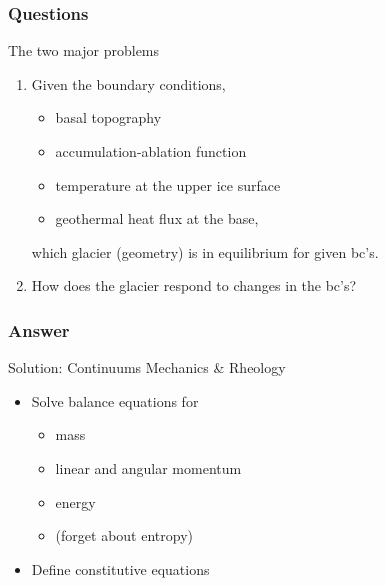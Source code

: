 \documentclass[hide notes,intlimits]{beamer}
\begin{document}
\begin{frame}
  \frametitle{Questions}
 \begin{block}{The two major problems}
   \begin{enumerate}
   \item Given the boundary conditions,
     \begin{itemize}
     \item basal topography
     \item accumulation-ablation function
     \item temperature at the upper ice surface
     \item geothermal heat flux at the base,
   \end{itemize}
   which glacier (geometry) is in equilibrium for given bc's.
  \item How does the glacier respond to changes in the bc's?
\end{enumerate}
  \end{block}
\end{frame}

\begin{frame}
  \frametitle{Answer}

 \begin{block}{Solution: Continuums Mechanics \& Rheology}
   \begin{itemize}
     \item Solve balance equations for
       \begin{itemize}
       \item mass
       \item linear and angular momentum
       \item energy
       \item (forget about entropy)
       \end{itemize}
     \item Define constitutive equations
  \end{itemize}
\end{block}
\end{frame}
\end{document}
